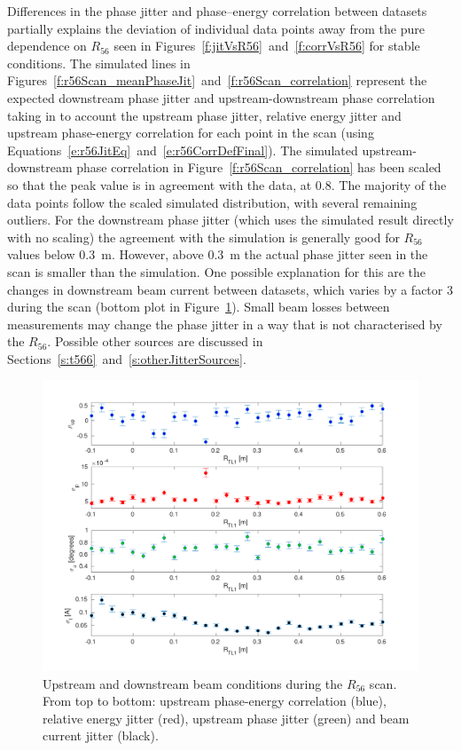 Differences in the phase jitter and phase--energy correlation between datasets partially explains the deviation of individual data points away from the pure dependence on \(R_{56}\) seen in Figures~\ref{f:jitVsR56}~and~\ref{f:corrVsR56} for stable conditions. The simulated lines in Figures~\ref{f:r56Scan_meanPhaseJit}~and~\ref{f:r56Scan_correlation} represent the expected downstream phase jitter and upstream-downstream phase correlation taking in to account the upstream phase jitter, relative energy jitter and upstream phase-energy correlation for each point in the scan (using Equations~\ref{e:r56JitEq}~and~\ref{e:r56CorrDefFinal}). The simulated upstream-downstream phase correlation in Figure~\ref{f:r56Scan_correlation} has been scaled so that the peak value is in agreement with the data, at 0.8. The majority of the data points follow the scaled simulated distribution, with several remaining outliers. For the downstream phase jitter (which uses the simulated result directly with no scaling) the agreement with the simulation is generally good for \(R_{56}\) values below 0.3~m. However, above 0.3~m the actual phase jitter seen in the scan is smaller than the simulation. One possible explanation for this are the changes in downstream beam current between datasets, which varies by a factor 3 during the scan (bottom plot in Figure~\ref{f:r56Scan_upstreamParams}). Small beam losses between measurements may change the phase jitter in a way that is not characterised by the \(R_{56}\). Possible other sources are discussed in Sections~\ref{s:t566}~and~\ref{s:otherJitterSources}.

\begin{figure}
  \centering
  \includegraphics[width=\textwidth]{Figures/propagation/r56Scan_upstreamParams}
  \caption{Upstream and downstream beam conditions during the \(R_{56}\) scan. From top to bottom: upstream phase-energy correlation (blue), relative energy jitter (red), upstream phase jitter (green) and beam current jitter (black).}
  \label{f:r56Scan_upstreamParams}
\end{figure}

